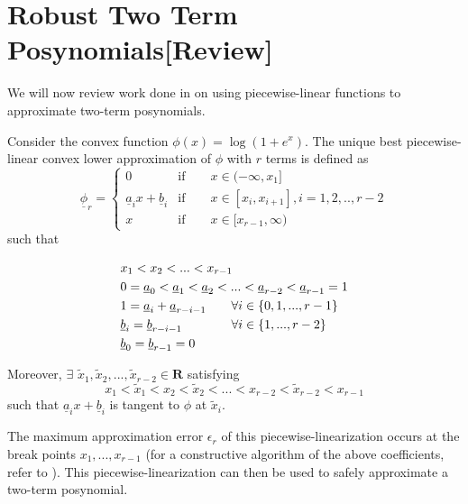 \section{Robust Two Term Posynomials[Review]} \label{twoTerm}

We will now review work done in \cite{hsiung_kim_boyd_2007} on using piecewise-linear functions to approximate two-term posynomials. 

Consider the convex function $\phi(x) = \log(1 + e^x)$. The unique best piecewise-linear convex lower approximation of $\phi$  with $r$ terms is defined as
\begin{equation}
\underline{\phi}_r = 
\begin{cases}
0 \qquad &\text{if} \qquad x \in (- \infty, x_1]\\
\underline{a}_ix + \underline{b}_i &\text{if} \qquad x \in [x_i, x_{i+1}], i=1,2,..,r-2\\
x &\text{if} \qquad x \in [x_{r-1}, \infty)
\end{cases}
\label{lower_phi}
\end{equation}
such that

\begin{align*}
& x_1 < x_2 < ... < x_{r-1} \\
& 0 = \underline{a}_0 < \underline{a}_1 < \underline{a}_2 < ... < \underline{a}_{r-2} < \underline{a}_{r-1} = 1 \\
& 1 = \underline{a}_i + \underline{a}_{r-i-1} \quad\quad \forall i \in \left\{0,1, ..., r-1\right\} \\
& \underline{b}_i = \underline{b}_{r-i-1} \hspace{1.38cm} \forall i \in \left\{1, ..., r-2\right\} \\
& \underline{b}_0 = \underline{b}_{r-1} = 0
\end{align*}

\noindent Moreover, $\exists$ $\tilde{x}_1, \tilde{x}_2, ..., \tilde{x}_{r-2} \in \mathbf{R}$ satisfying
$$
x_1 < \tilde{x}_1 < x_2 < \tilde{x}_2 < ... < x_{r-2} < \tilde{x}_{r-2} < x_{r-1}
$$
such that $\underline{a}_ix + \underline{b}_i$ is tangent to $\phi$ at $\tilde{x}_i$.

The maximum approximation error $\epsilon_r$ of this piecewise-linearization occurs at the break points $x_1, ..., x_{r-1}$ (for a constructive algorithm of the above coefficients, refer to \cite{hsiung_kim_boyd_2007}). This piecewise-linearization can then be used to safely approximate a two-term posynomial.

